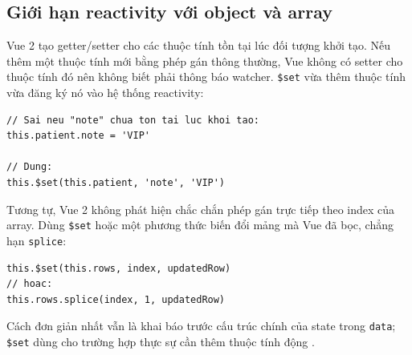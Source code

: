 \subsection{Giới hạn reactivity với object và array}

Vue 2 tạo getter/setter cho các thuộc tính tồn tại lúc đối tượng khởi tạo. Nếu thêm
một thuộc tính mới bằng phép gán thông thường, Vue không có setter cho thuộc tính đó
nên không biết phải thông báo watcher. \texttt{\$set} vừa thêm thuộc tính vừa đăng ký nó
vào hệ thống reactivity:

\Needspace{0.14\textheight}
\begin{lstlisting}
// Sai neu "note" chua ton tai luc khoi tao:
this.patient.note = 'VIP'

// Dung:
this.$set(this.patient, 'note', 'VIP')
\end{lstlisting}

Tương tự, Vue 2 không phát hiện chắc chắn phép gán trực tiếp theo index của array.
Dùng \texttt{\$set} hoặc một phương thức biến đổi mảng mà Vue đã bọc, chẳng hạn
\texttt{splice}:

\Needspace{0.10\textheight}
\begin{lstlisting}
this.$set(this.rows, index, updatedRow)
// hoac:
this.rows.splice(index, 1, updatedRow)
\end{lstlisting}

Cách đơn giản nhất vẫn là khai báo trước cấu trúc chính của state trong \texttt{data};
\texttt{\$set} dùng cho trường hợp thực sự cần thêm thuộc tính động
\cite{vue2-reactivity}.
